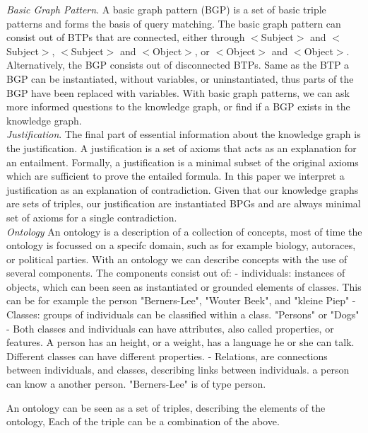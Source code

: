 \documentclass{article}
\begin{document}
\textit{Basic Graph Pattern}. A basic graph pattern (BGP) is a set of basic triple patterns and forms the basis of query matching. The basic graph pattern
can consist out of BTPs that are connected, either through $<$Subject$>$ and $<$Subject$>$, $<$Subject$>$ and $<$Object$>$, or $<$Object$>$ and $<$Object$>$.
Alternatively, the BGP consists out of disconnected BTPs. Same as the BTP a BGP can be instantiated, without variables, or uninstantiated, thus parts of the BGP have been replaced with variables. With basic graph patterns, we can ask more informed questions to the knowledge graph, or find if a BGP exists in the knowledge graph.\\

\textit{Justification}. The final part of essential information about the knowledge graph is the justification\cite{Horridge:2009}. A justification is a set of axioms that acts as an explanation for an entailment.
Formally, a justification is a minimal subset of the original axioms which are sufficient to prove the entailed formula. In this paper we interpret a justification as an explanation of contradiction. Given that our knowledge graphs are sets of triples, our justification are instantiated BPGs and are always minimal set of axioms for a single contradiction. \\

\textit{Ontology} An ontology is a description of a collection of concepts, most of time the ontology is focussed on a specifc domain, such as for example biology, autoraces, or political parties. With an ontology we can describe concepts with the use of several components. The components consist out of:
 - individuals: instances of objects, which can been seen as instantiated or grounded elements of classes. This can be for example the person "Berners-Lee", "Wouter Beek", and "kleine Piep"
 - Classes: groups of individuals can be classified within a class. "Persons" or "Dogs"
 - Both classes and individuals can have attributes, also called properties, or features. A person has an height, or a weight, has a language he or she can talk. Different classes can have different properties. 
 - Relations, are connections between individuals, and classes, describing links between individuals. a person can know a another person. "Berners-Lee" is of type person. 

An ontology can be seen as a set of triples, describing the elements of the ontology, Each of the triple can be a combination of the above.
\end{document}
